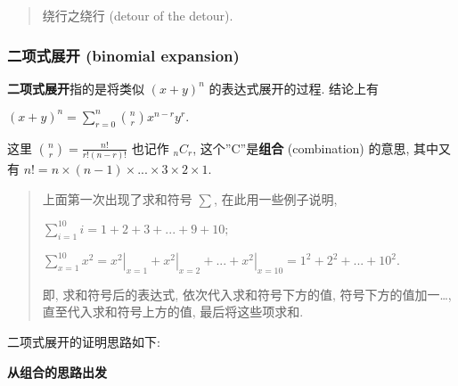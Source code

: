\begin{quote}
绕行之绕行 (detour of the detour).
\end{quote}

\hypertarget{ux4e8cux9879ux5f0fux5c55ux5f00-binomial-expansion}{%
\subsubsection{二项式展开 (binomial
expansion)}\label{ux4e8cux9879ux5f0fux5c55ux5f00-binomial-expansion}}

\textbf{二项式展开}指的是将类似 \((x+y)^n\) 的表达式展开的过程. 结论上有

\(\boxed{(x+y)^n=\sum_{r=0}^n\binom{n}{r}x^{n-r}y^r}.\)

这里 \(\binom{n}{r}=\frac{n!}{r!(n-r)!}\) 也记作 \(_nC_r\),
这个''C''是\textbf{组合} (combination) 的意思, 其中又有
\(n!=n\times(n-1)\times...\times3\times2\times1\).

\begin{quote}
上面第一次出现了求和符号 \(\sum\), 在此用一些例子说明,

\(\sum_{i=1}^{10}i=1+2+3+...+9+10;\)

\(\sum_{x=1}^{10}x^2=\left.x^2\right|_{x=1}+\left.x^2\right|_{x=2}+...+\left.x^2\right|_{x=10}=1^2+2^2+...+10^2.\)

即, 求和符号后的表达式, 依次代入求和符号下方的值,
符号下方的值加一\ldots, 直至代入求和符号上方的值, 最后将这些项求和.
\end{quote}

二项式展开的证明思路如下:

\textbf{从组合的思路出发}

